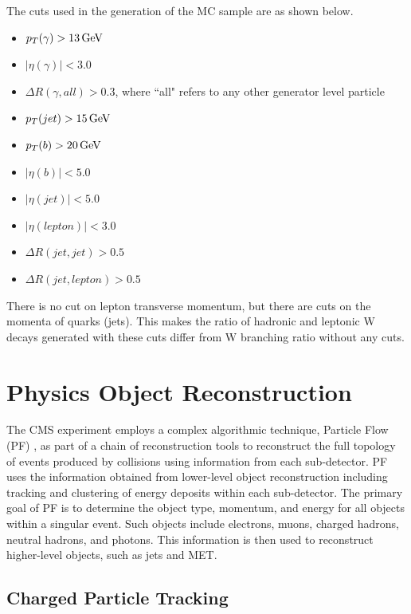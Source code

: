 The cuts used in the generation of the \MADGRAPH MC sample are as shown below.

\begin{itemize}
	\item $p_T (\gamma) > 13 \,\text{Ge\hspace{-.08em}V}$
	\item $|\eta(\gamma)| < 3.0$
	\item $\Delta R (\gamma, all) > 0.3$, where ``all" refers to any other generator level particle
	\item $p_T (jet) > 15 \,\text{Ge\hspace{-.08em}V}$
	\item $p_T (b) > 20 \,\text{Ge\hspace{-.08em}V}$
	\item $|\eta (b)| < 5.0$
	\item $|\eta (jet)| < 5.0$
	\item $| \eta (lepton)| < 3.0$
	\item $\Delta R (jet, jet) > 0.5$
	\item $\Delta R (jet, lepton) > 0.5$
\end{itemize}

There is no cut on lepton transverse momentum, but there are cuts on the momenta of quarks (jets). This makes the ratio of hadronic and leptonic W decays generated with these cuts differ from W branching ratio without any cuts.

\section{Physics Object Reconstruction} \label{sec-ParticleObjectReconstruction}

The CMS experiment employs a complex algorithmic technique, Particle Flow (PF) \cite{CMS-PAS-PFT-09-001}, as part of a chain of reconstruction tools to reconstruct the full topology of events produced by collisions using information from each sub-detector. PF uses the information obtained from lower-level object reconstruction including tracking and clustering of energy deposits within each sub-detector. The primary goal of PF is to determine the object type, momentum, and energy for all objects within a singular event. Such objects include electrons, muons,  charged hadrons, neutral hadrons, and photons. This information is then used to reconstruct higher-level objects, such as jets and MET.

\subsection{Charged Particle Tracking} \label{subsec-ChargedParticleTracking}

